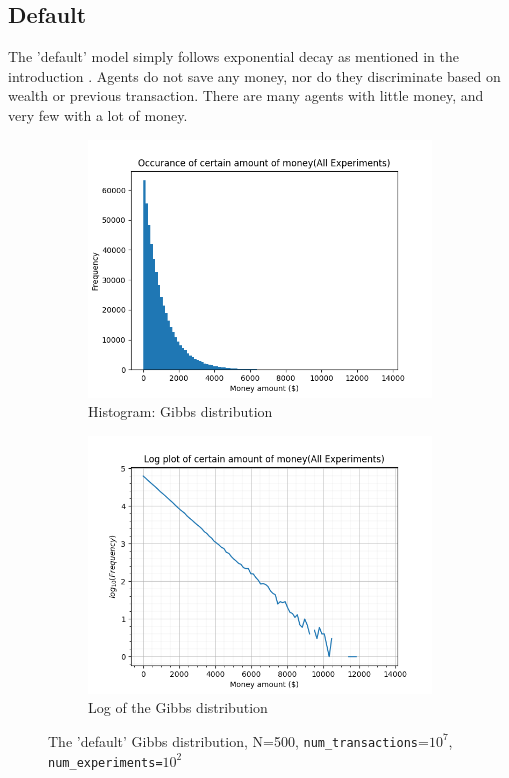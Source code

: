 \documentclass[12pt]{article} %
\begin{document}
\subsection{Default}
The 'default' model simply follows exponential decay as mentioned in the
introduction \cite{Pareto}. Agents do not save any money, nor do they
discriminate based on wealth or previous transaction. There are many agents
with little money, and very few with a lot of money.
\newcommand{\scaleResults}{0.45}
\begin{figure}
	\begin{subfigure}{0.5\textwidth}
		\includegraphics[scale=\scaleResults]{default.png}
		\caption{Histogram: Gibbs distribution}
	\end{subfigure}
	\begin{subfigure}{0.5\textwidth}
		\includegraphics[scale=\scaleResults]{default_log.png}
		\caption{Log of the Gibbs distribution}
	\end{subfigure}
	\caption{The 'default' Gibbs distribution, N=500,
	\texttt{num\_transactions}=$10^7$, \texttt{num\_experiments=$10^2$}}
\end{figure}
\end{document}
